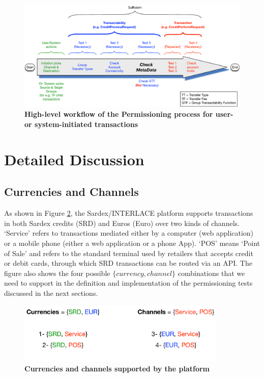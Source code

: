 \begin{figure}[htbp]
\centering
\includegraphics[width=16cm]{Figures/Transactability_Workflow}
\caption{\small\textbf{High-level workflow of the Permissioning process for user- or system-initiated transactions}}
\label{fig:transactabilitywkflow}
\end{figure}

\section{Detailed Discussion}

\subsection{Currencies and Channels}
As shown in Figure \ref{fig:currchan}, the Sardex/INTERLACE platform supports transactions in both Sardex credits (SRD) and Euros (Euro) over two kinds of channels. `Service' refers to transactions mediated either by a computer (web application) or a mobile phone (either a web application or a phone App). `POS' means `Point of Sale' and refers to the standard terminal used by retailers that accepts credit or debit cards, through which SRD transactions can be routed via an API. The figure also shows the four possible $\{ currency, channel \}$ combinations that we need to support in the definition and implementation of the permissioning tests discussed in the next sections.

\begin{figure}[htbp]
\centering
\includegraphics[width=10cm]{Figures/Curr_Chan}
\caption{\small\textbf{Currencies and channels supported by the platform}}
\label{fig:currchan}
\end{figure}

